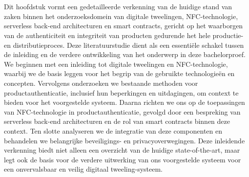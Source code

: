 \chapter{}%
\label{ch:stand-van-zaken}

Dit hoofdstuk vormt een gedetailleerde verkenning van de huidige stand van zaken binnen het onderzoeksdomein van digitale tweelingen, NFC-technologie, serverless back-end architecturen en smart contracts, gericht op het waarborgen van de authenticiteit en integriteit van producten gedurende het hele productie- en distributieproces. Deze literatuurstudie dient als een essentiële schakel tussen de inleiding en de verdere ontwikkeling van het onderwerp in deze bachelorproef. We beginnen met een inleiding tot digitale tweelingen en NFC-technologie, waarbij we de basis leggen voor het begrip van de gebruikte technologieën en concepten. Vervolgens onderzoeken we bestaande methoden voor productauthenticatie, inclusief hun beperkingen en uitdagingen, om context te bieden voor het voorgestelde systeem. Daarna richten we ons op de toepassingen van NFC-technologie in productauthenticatie, gevolgd door een bespreking van serverless back-end architecturen en de rol van smart contracts binnen deze context. Ten slotte analyseren we de integratie van deze componenten en behandelen we belangrijke beveiligings- en privacyoverwegingen. Deze inleidende verkenning biedt niet alleen een overzicht van de huidige state-of-the-art, maar legt ook de basis voor de verdere uitwerking van ons voorgestelde systeem voor een onvervalsbaar en veilig digitaal tweeling-systeem.
\section{}
\label{sec:introductie}
